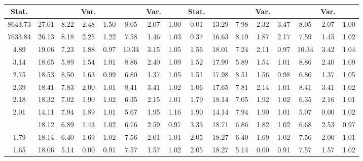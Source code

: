 \begin{landscape}
\begin{table}[tb]
\begin{tabular}{|c|c|c|c|c|c|c|c||c|c|c|c|c|c|c|c|}
Stat. & & & Var. & & & Var. & & Stat. & & & Var. & & & Var.\\
\hline
8643.73 & 27.01 & 8.22 & 2.48 & 1.50 & 8.05 & 2.07 & 1.00 & 0.01 & 13.29 & 7.98 & 2.32 & 3.47 & 8.05 & 2.07 & 1.00 \\
7633.84 & 26.13 & 8.18 & 2.25 & 1.22 & 7.58 & 1.46 & 1.03 & 0.37 & 16.63 & 8.19 & 1.87 & 2.17 & 7.59 & 1.45 & 1.02 \\
4.89 & 19.06 & 7.23 & 1.88 & 0.97 & 10.34 & 3.15 & 1.05 & 1.56 & 18.01 & 7.24 & 2.11 & 0.97 & 10.34 & 3.42 & 1.04 \\
3.14 & 18.65 & 5.89 & 1.54 & 1.01 & 8.86 & 2.40 & 1.09 & 1.52 & 17.99 & 5.89 & 1.54 & 1.01 & 8.86 & 2.40 & 1.09 \\
2.75 & 18.53 & 8.50 & 1.63 & 0.99 & 6.80 & 1.37 & 1.05 & 1.51 & 17.98 & 8.51 & 1.56 & 0.98 & 6.80 & 1.37 & 1.05 \\
2.39 & 18.41 & 7.83 & 2.00 & 1.01 & 8.41 & 3.41 & 1.02 & 1.06 & 17.65 & 7.81 & 2.14 & 1.01 & 8.41 & 3.41 & 1.02 \\
2.18 & 18.32 & 7.02 & 1.90 & 1.02 & 6.35 & 2.15 & 1.01 & 1.79 & 18.14 & 7.05 & 1.92 & 1.02 & 6.35 & 2.16 & 1.01 \\
2.01 & 14.11 & 7.94 & 1.89 & 1.01 & 5.67 & 1.95 & 1.16 & 1.90 & 14.14 & 7.94 & 1.90 & 1.01 & 5.07 & 0.00 & 1.02 \\
\hdashline
1.76 & 18.12 & 6.89 & 1.43 & 1.02 & 6.76 & 2.59 & 0.97 & 3.33 & 18.71 & 6.86 & 1.82 & 1.02 & 6.68 & 2.53 & 0.97 \\
1.79 & 18.14 & 6.40 & 1.69 & 1.02 & 7.56 & 2.01 & 1.01 & 2.05 & 18.27 & 6.40 & 1.69 & 1.02 & 7.56 & 2.00 & 1.01 \\
1.65 & 18.06 & 5.14 & 0.00 & 0.91 & 7.57 & 1.57 & 1.02 & 2.05 & 18.27 & 5.14 & 0.00 & 0.91 & 7.57 & 1.57 & 1.02 \\
\hline
\end{tabular}
\end{table}
\end{landscape}
\restoregeometry %

\newpage

